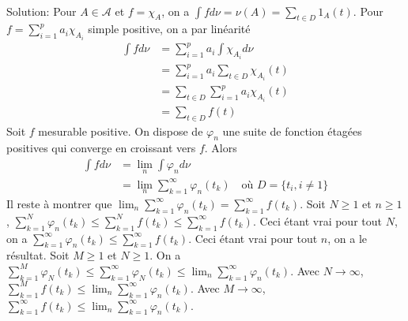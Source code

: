 \documentclass{report}
\begin{document}
\newpage 
\subsection{} \\ \\

Solution: Pour $A\in \mathcal A$ et $f=\chi_A$, on a $\int f d\nu = \nu(A) = \sum_{t\in D} 1_A(t)$. \newline
Pour $f=\sum_{i=1}^p a_i \chi_{A_i}$ simple positive, on a par linéarité $$\begin{aligned}
\int f d\nu &= \sum_{i=1}^p a_i \int \chi_{A_i} d\nu \\
&= \sum_{i=1}^p a_i \sum_{t\in D} \chi_{A_i}(t)\\
&= \sum_{t\in D}\sum_{i=1}^p a_i \chi_{A_i}(t) \\
&= \sum_{t\in D} f(t)
\end{aligned}$$
Soit $f$ mesurable positive. On dispose de $\varphi_n$ une suite de fonction étagées positives qui converge en croissant vers $f$. Alors $$\begin{aligned}
\int f d\nu &= \lim_n \int \varphi_n d\nu\\
&= \lim_n \sum_{k=1}^\infty \varphi_n(t_k) \quad \text{où } D=\{t_i, i\neq 1\}
\end{aligned}$$
Il reste à montrer que $\displaystyle \lim_n \sum_{k=1}^\infty \varphi_n(t_k) = \sum_{k=1}^\infty f(t_k)$.\newline 
\fbox{$\leq$} Soit $N\geq 1$ et $n\geq 1$, $\displaystyle \sum_{k=1}^N \varphi_{n}(t_k)\leq \sum_{k=1}^N f(t_k) \leq \sum_{k=1}^{\infty} f(t_k) $. Ceci étant vrai pour tout $N$, on a $\displaystyle \sum_{k=1}^\infty \varphi_{n}(t_k)\leq \sum_{k=1}^{\infty} f(t_k) $. Ceci étant vrai pour tout $n$, on a le résultat.\newline
\fbox{$\geq $} Soit $M\geq 1$ et $N\geq 1$. On a $\displaystyle \sum_{k=1}^M \varphi_N(t_k)\leq \sum_{k=1}^\infty \varphi_N(t_k) \leq \lim_n \sum_{k=1}^\infty \varphi_n(t_k)$.\newline
Avec $N\to \infty$, $\displaystyle \sum_{k=1}^M f(t_k) \leq \lim_n \sum_{k=1}^\infty \varphi_n(t_k)$. Avec $M\to \infty$, $\displaystyle \sum_{k=1}^\infty f(t_k) \leq \lim_n \sum_{k=1}^\infty \varphi_n(t_k)$.
\end{document}
